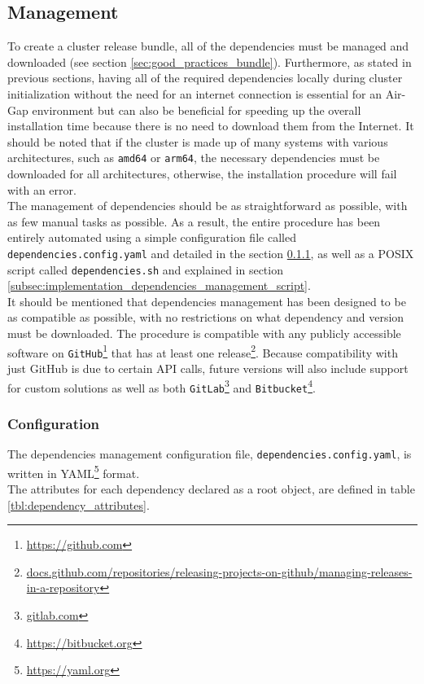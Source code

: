 \subsection{Management}
\label{subsec:implementation_dependencies_management}

To create a cluster release bundle, all of the dependencies must be managed and
downloaded (see section \ref{sec:good_practices_bundle}). Furthermore, as stated
in previous sections, having all of the required dependencies locally during cluster
initialization without the need for an internet connection is essential for an Air-Gap
environment but can also be beneficial for speeding up the overall installation time
because there is no need to download them from the Internet. It should be noted
that if the cluster is made up of many systems with various architectures, such as
\texttt{amd64} or \texttt{arm64}, the necessary dependencies must be downloaded
for all architectures, otherwise, the installation procedure will fail with an
error. \\ %
The management of dependencies should be as straightforward as possible, with as
few manual tasks as possible. As a result, the entire procedure has been entirely
automated using a simple configuration file called \texttt{dependencies.config.yaml}
and detailed in the section
\ref{subsec:implementation_dependencies_management_configuration}, as well as a POSIX
script called \texttt{dependencies.sh} and explained in section
\ref{subsec:implementation_dependencies_management_script}. \\ %
It should be mentioned that dependencies management has been designed to be as
compatible as possible, with no restrictions on what dependency and version must
be downloaded. The procedure is compatible with any publicly accessible software
on \texttt{GitHub}\footnote{\url{https://github.com}} that has at least one release\footnote{\url{docs.github.com/repositories/releasing-projects-on-github/managing-releases-in-a-repository}}.
Because compatibility with just GitHub is due to certain API calls, future versions
will also include support for custom solutions as well as both \texttt{GitLab}\footnote{\url{gitlab.com}}
and \texttt{Bitbucket}\footnote{\url{https://bitbucket.org}}.
\subsubsection{Configuration}
\label{subsec:implementation_dependencies_management_configuration}

The dependencies management configuration file, \texttt{dependencies.config.yaml},
is written in YAML\footnote{\url{https://yaml.org}} format. \\ %
The attributes for each dependency declared as a root object, are defined in table
\ref{tbl:dependency_attributes}.

